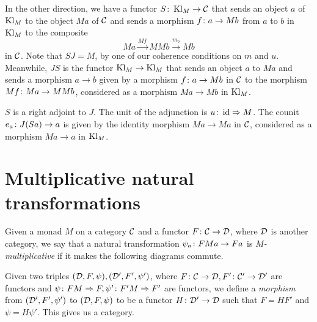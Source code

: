 In the other direction, we have a functor $ S \colon \operatorname{Kl}_M \to {\mathcal{C}}$ that sends an object $a$ of $\operatorname{Kl}_M$ to the object $Ma$ of ${\mathcal{C}}$ and sends a morphism $f\colon a \to M b$ from $a$ to $b$ in $\operatorname{Kl}_M$ to the composite
\[
  Ma \xrightarrow{M f}
  MMb \xrightarrow{m_b}
  Mb
  \]
in ${\mathcal{C}}$.  
Note that $ S J=M$, by one of our coherence conditions on $m$ and $u$.
Meanwhile, $J S $ is the functor $\operatorname{Kl}_M\to\operatorname{Kl}_M$ that sends an object $a$ to $Ma$ and sends a morphism $a\to b$ given by a morphism $f\colon a \to Mb$ in ${\mathcal{C}}$ to the morphism $Mf\colon Ma \to MMb$, considered as a morphism $Ma \to Mb$ in $\operatorname{Kl}_M$.
\begin{proposition}
  $ S $ is a right adjoint to $J$.
  The unit of the adjunction is $u\colon \operatorname{id} \Rightarrow M$.  
  The counit $e_a\colon J( S  a) \to a$ is given by the identity morphism $Ma \to Ma$ in ${\mathcal{C}}$, considered as a morphism $Ma \to a$ in $\operatorname{Kl}_M$.
  \label{prop:KleisliHasAdjunction}
\end{proposition}

\section{Multiplicative natural transformations}

Given a monad $M$ on a category ${\mathcal{C}}$ and a functor $F\colon {\mathcal{C}} \to {\mathcal{D}}$, where ${\mathcal{D}}$ is another category, we say that a natural transformation $\psi_a \colon FMa \to Fa$ is \emph{$M$-multiplicative} if it makes the following diagrams commute.

Given two triples $({\mathcal{D}}, F,\psi), ({\mathcal{D}}', F',\psi')$, where $F\colon {\mathcal{C}} \to {\mathcal{D}}, F'\colon {\mathcal{C}}'\to{\mathcal{D}}'$ are functors and $\psi\colon FM\Rightarrow F, \psi'\colon F'M\Rightarrow F'$ are functors, we define a \emph{morphism} from $({\mathcal{D}}', F',\psi')$ to $({\mathcal{D}}, F, \psi)$ to be a functor $H\colon {\mathcal{D}}' \to {\mathcal{D}}$ such that $F=HF'$ and $\psi=H\psi'$.  
This gives us a category.

